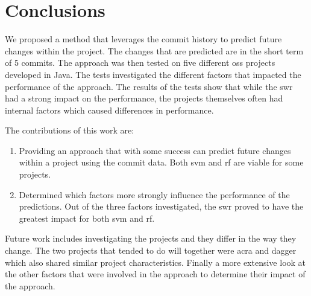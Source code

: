 \chapter{Conclusions}
\label{chap:conclusions}


We proposed a method that leverages the commit history to predict future changes within the project. The changes that are predicted are in the short term of 5 commits. The approach was then tested on five different \gls{oss} projects developed in Java. The tests investigated the different factors that impacted the performance of the approach. The results of the tests show that while the \gls{swr} had a strong impact on the performance, the projects themselves often had internal factors which caused differences in performance.

The contributions of this work are:
\begin{enumerate}
\item Providing an approach that with some success can predict future changes within a project using the commit data. Both \gls{svm} and \gls{rf} are viable for some projects.
\item Determined which factors more strongly influence the performance of the predictions. Out of the three factors investigated, the \gls{swr} proved to have the greatest impact for both \gls{svm} and \gls{rf}.
\end{enumerate}

Future work includes investigating the projects and they differ in the way they change. The two projects that tended to do will together were acra and dagger which also shared similar project characteristics. Finally a more extensive look at the other factors that were involved in the approach to determine their impact of the approach.



